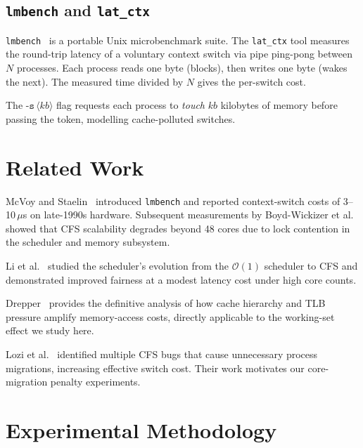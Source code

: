 \documentclass[conference]{IEEEtran}
\begin{document}
\subsection{\texttt{lmbench} and \texttt{lat\_ctx}}

\texttt{lmbench}~\cite{mcvoy1996lmbench} is a portable Unix
microbenchmark suite.  The \texttt{lat\_ctx} tool measures the
round-trip latency of a voluntary context switch via pipe
ping-pong between $N$ processes.  Each process reads one byte
(blocks), then writes one byte (wakes the next).  The measured
time divided by $N$ gives the per-switch cost.

The $\texttt{-s}\,\langle kb \rangle$ flag requests each process
to \emph{touch} $kb$ kilobytes of memory before passing the token,
modelling cache-polluted switches.

\section{Related Work}
\label{sec:related}

McVoy and Staelin~\cite{mcvoy1996lmbench} introduced \texttt{lmbench}
and reported context-switch costs of 3–10\,$\mu$s on late-1990s hardware.
Subsequent measurements by Boyd-Wickizer et al.~\cite{boydwickizer2010linux}
showed that CFS scalability degrades beyond 48 cores due to lock
contention in the scheduler and memory subsystem.

Li et al.~\cite{li2007scheduler} studied the scheduler's evolution from
the $\mathcal{O}(1)$ scheduler to CFS and demonstrated improved fairness
at a modest latency cost under high core counts.

Drepper~\cite{drepper2007memory} provides the definitive analysis of
how cache hierarchy and TLB pressure amplify memory-access costs, directly
applicable to the working-set effect we study here.

Lozi et al.~\cite{lozi2016linux} identified multiple CFS bugs that
cause unnecessary process migrations, increasing effective switch cost.
Their work motivates our core-migration penalty experiments.

\section{Experimental Methodology}
\label{sec:method}
\end{document}
